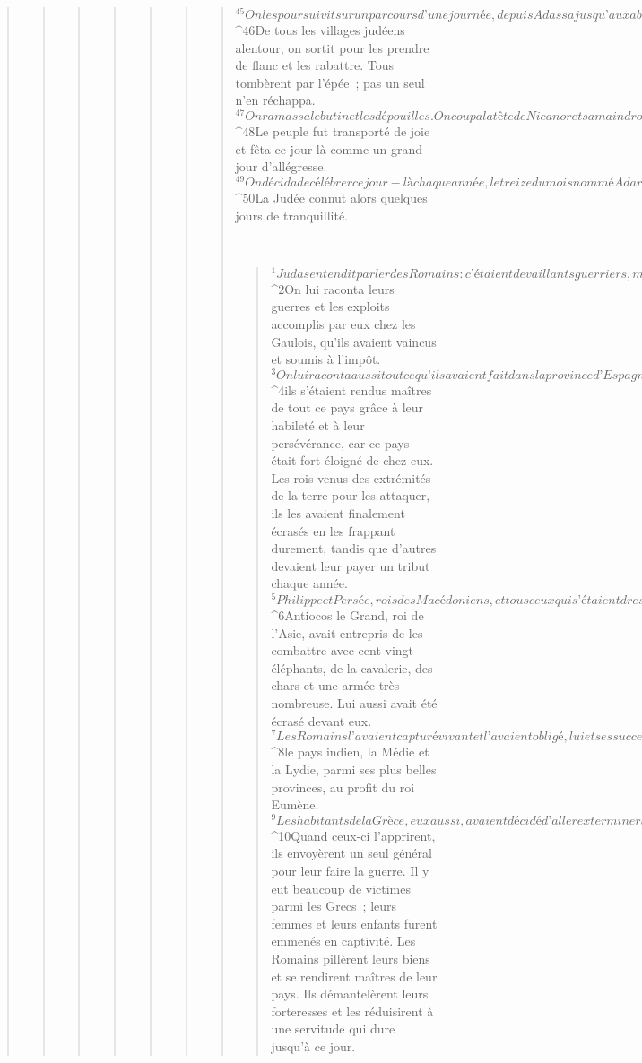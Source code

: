 \begin{verse}
\begin{verse}
\begin{verse}
\begin{verse}
\begin{verse}
\begin{verse}
\begin{verse}
${}^{45}On les poursuivit sur un parcours d’une journée, depuis Adassa jusqu’aux abords de Gazara, les trompettes sonnant derrière eux pour donner le signal. 
${}^{46}De tous les villages judéens alentour, on sortit pour les prendre de flanc et les rabattre. Tous tombèrent par l’épée ; pas un seul n’en réchappa. 
${}^{47}On ramassa le butin et les dépouilles. On coupa la tête de Nicanor et sa main droite, qu’il avait levée dans un geste d’arrogance ; on les emporta pour les exposer aux abords de Jérusalem. 
${}^{48}Le peuple fut transporté de joie et fêta ce jour-là comme un grand jour d’allégresse. 
${}^{49}On décida de célébrer ce jour-là chaque année, le treize du mois nommé Adar. 
${}^{50}La Judée connut alors quelques jours de tranquillité.
      
         
      \bchapter{}
      \begin{verse}
${}^{1}Judas entendit parler des Romains : c’étaient de vaillants guerriers, mais bien disposés envers tous ceux qui se rangeaient à leurs côtés et accordant leur amitié à tous ceux qui venaient à eux. 
${}^{2}On lui raconta leurs guerres et les exploits accomplis par eux chez les Gaulois, qu’ils avaient vaincus et soumis à l’impôt. 
${}^{3}On lui raconta aussi tout ce qu’ils avaient fait dans la province d’Espagne pour s’emparer des mines d’argent et d’or qui s’y trouvaient : 
${}^{4}ils s’étaient rendus maîtres de tout ce pays grâce à leur habileté et à leur persévérance, car ce pays était fort éloigné de chez eux. Les rois venus des extrémités de la terre pour les attaquer, ils les avaient finalement écrasés en les frappant durement, tandis que d’autres devaient leur payer un tribut chaque année. 
${}^{5}Philippe et Persée, rois des Macédoniens, et tous ceux qui s’étaient dressés contre eux, ils leur avaient fait la guerre et les avaient vaincus. 
${}^{6}Antiocos le Grand, roi de l’Asie, avait entrepris de les combattre avec cent vingt éléphants, de la cavalerie, des chars et une armée très nombreuse. Lui aussi avait été écrasé devant eux. 
${}^{7}Les Romains l’avaient capturé vivant et l’avaient obligé, lui et ses successeurs, à verser un lourd tribut. Il avait dû livrer des otages et céder 
${}^{8}le pays indien, la Médie et la Lydie, parmi ses plus belles provinces, au profit du roi Eumène. 
${}^{9}Les habitants de la Grèce, eux aussi, avaient décidé d’aller exterminer les Romains. 
${}^{10}Quand ceux-ci l’apprirent, ils envoyèrent un seul général pour leur faire la guerre. Il y eut beaucoup de victimes parmi les Grecs ; leurs femmes et leurs enfants furent emmenés en captivité. Les Romains pillèrent leurs biens et se rendirent maîtres de leur pays. Ils démantelèrent leurs forteresses et les réduisirent à une servitude qui dure jusqu’à ce jour. 

\end{verse}
\end{verse}
\end{verse}
\end{verse}
\end{verse}
\end{verse}
\end{verse}
\end{verse}
